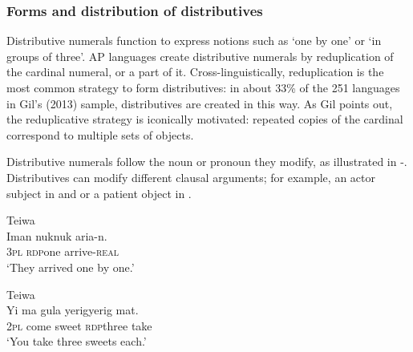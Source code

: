 \subsubsection{Forms and distribution of distributives}
Distributive numerals function to express notions such as `one by one' or `in groups of three'. AP languages create distributive numerals by reduplication of the cardinal numeral, or a part of it. Cross-linguistically, reduplication is the most common strategy to form distributives: in about 33\% of the 251 languages in Gil's (2013) \nocite{Gil2013} sample, distributives are created in this way. As Gil points out, the reduplicative strategy is iconically motivated: repeated copies of the cardinal correspond to multiple sets of objects.

Distributive numerals follow the noun or pronoun they modify, as illustrated in -. Distributives can modify different clausal arguments; for example, an actor subject in  and  or a patient object in .


\ea%
\label{bkm:Ref342655549}
{\upshape Teiwa}\\
\gll Iman  nuk\textit{{\Tilde}}nuk  aria-n.\\  
    \textsc{3pl}   \textsc{rdp}\textit{{\Tilde}}one   arrive-\textsc{real}\\
\glt `They arrived one by one.' 
\z

    

   

    
 

   

   

\ea%
\label{bkm:Ref342655553}
{\upshape Teiwa}\\
\gll Yi   ma   gula   yerig{\Tilde}yerig   mat.\\  
     2\textsc{pl } come  sweet  \textsc{rdp}\textit{{\Tilde}}three  take \\
\glt `You take three sweets each.'
\z

